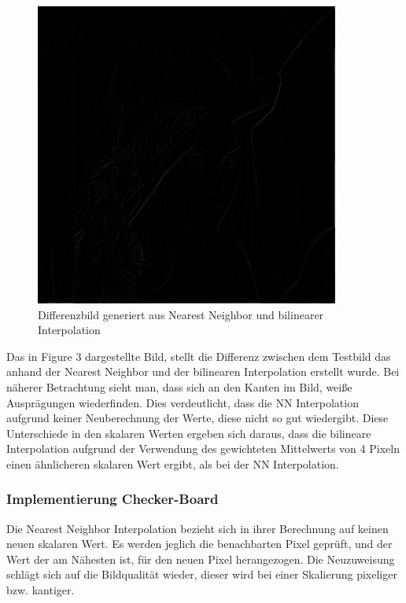 \documentclass[12pt,german]{article}
\begin{document}
\begin{figure}[H]
	\centering
	\includegraphics[width=10cm]{images/bilineare-interpolation-final/differenz-bilinear-2.jpg}
	\caption{Differenzbild generiert aus Nearest Neighbor und bilinearer Interpolation}
	\label{fig:resultResamplingDifference}
\end{figure}

Das in Figure 3 dargestellte Bild, stellt die Differenz zwischen dem Testbild das anhand der Nearest Neighbor und der bilinearen Interpolation erstellt wurde. Bei näherer Betrachtung sieht man, dass sich an den Kanten im Bild, weiße Ausprägungen wiederfinden. Dies verdeutlicht, dass die NN Interpolation aufgrund keiner Neuberechnung der Werte, diese nicht so gut wiedergibt. Diese Unterschiede in den skalaren Werten ergeben sich daraus, dass die bilineare Interpolation aufgrund der Verwendung des gewichteten Mittelwerts von 4 Pixeln einen ähnlicheren skalaren Wert ergibt, als bei der NN Interpolation.




\subsubsection{Implementierung Checker-Board}

Die Nearest Neighbor Interpolation bezieht sich in ihrer Berechnung auf keinen neuen skalaren Wert. Es werden jeglich die benachbarten Pixel geprüft, und der Wert der am Nähesten ist, für den neuen Pixel herangezogen. Die Neuzuweisung schlägt sich auf die Bildqualität wieder, dieser wird bei einer Skalierung pixeliger bzw. kantiger.
\end{document}
